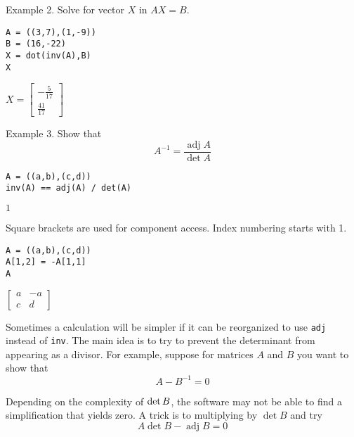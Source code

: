 \documentclass[12pt]{article}
\begin{document}
\bigskip

Example 2. Solve for vector $X$ in $AX=B$.

{\color{blue}
\begin{verbatim}
A = ((3,7),(1,-9))
B = (16,-22)
X = dot(inv(A),B)
X
\end{verbatim}
}

$\displaystyle
X=
\begin{bmatrix}
-\frac{5}{17}
\\[1ex]
\frac{41}{17}
\end{bmatrix}
$

\bigskip

Example 3. Show that
\begin{equation*}
A^{-1}=\frac{\operatorname{adj}A}{\operatorname{det}A}
\end{equation*}

{\color{blue}
\begin{verbatim}
A = ((a,b),(c,d))
inv(A) == adj(A) / det(A)
\end{verbatim}
}

$1$

\iffalse

\bigskip

Square brackets are used for component access.
Index numbering starts with 1.

{\color{blue}
\begin{verbatim}
A = ((a,b),(c,d))
A[1,2] = -A[1,1]
A
\end{verbatim}
}

$\displaystyle
\begin{bmatrix}
a & -a
\\[1ex]
c & d
\end{bmatrix}
$

\bigskip

Sometimes a calculation will be simpler if it can be reorganized to use
\verb$adj$ instead of \verb$inv$.
The main idea is to try to prevent the determinant from appearing as a
divisor.
For example, suppose for matrices $A$ and $B$ you want to show that
\begin{equation*}
{A}-{B}^{-1}=0
\end{equation*}

Depending on the complexity of $\mathop{\rm det}B$, the software
may not be able to find a simplification that yields zero.
A trick is to multiplying by $\operatorname{det}B$ and try
\begin{equation*}
A\operatorname{det}B-\operatorname{adj}B=0
\end{equation*}
\end{document}
